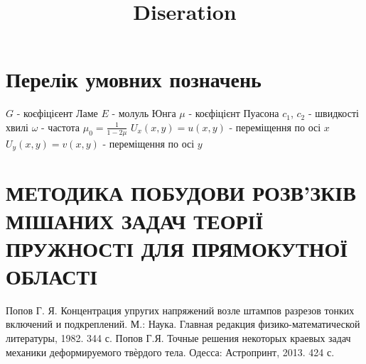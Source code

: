 \documentclass[a4paper,10pt]{extarticle}
\title{Diseration}
\author{}
\date{}
\numberwithin{equation}{section}
\begin{document}
\newpage

\renewcommand{\contentsname}{\centering Зміст}
\tableofcontents

\newpage

\section*{\centering Перелік умовних позначень}
$G$ - коєфіцієент Ламе \newline
$E$ - молуль Юнга \newline
$\mu$ - коєфіцієнт Пуасона \newline
$c_1$, $c_2$ - швидкості хвилі \newline
$\omega$ - частота \newline
$\mu_0 = \frac{1}{1 - 2\mu}$ \newline
$U_x(x,y) = u(x,y)$ - переміщення по осі $x$ \newline
$U_y(x,y) = v(x,y)$ - переміщення по осі $y$

\section{МЕТОДИКА ПОБУДОВИ РОЗВ’ЗКІВ МІШАНИХ ЗАДАЧ ТЕОРІЇ ПРУЖНОСТІ ДЛЯ ПРЯМОКУТНОЇ ОБЛАСТІ}


% 

% 

\begin{thebibliography}{1}
    Попов Г. Я. Концентрация упругих напряжений возле штампов разрезов тонких включений и подкреплений. М.: Наука. Главная редакция физико-математической литературы, 1982. 344 с.
    Попов Г.Я. Точные решения некоторых краевых задач механики деформируемого твѐрдого тела. Одесса: Астропринт, 2013. 424 с.

\end{thebibliography}

\end{document}
